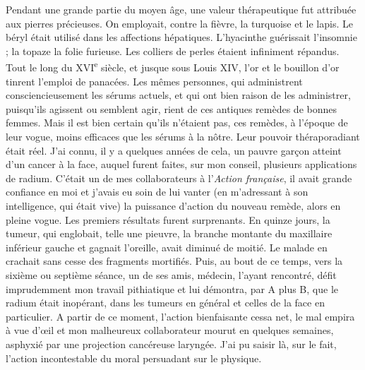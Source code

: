 \documentclass[french,twoside]{book} %
\begin{document}
Pendant une grande partie du moyen âge, une valeur thérapeutique fut attribuée aux pierres précieuses. On employait, contre la fièvre, la turquoise et le lapis. Le béryl était utilisé dans les affections hépatiques. L’hyacinthe guérissait l’insomnie ; la topaze la folie furieuse. Les colliers de perles étaient infiniment répandus. Tout le long du XVI\textsuperscript{e} siècle, et jusque sous Louis XIV, l’or et le bouillon d’or tinrent l’emploi de panacées. Les mêmes personnes, qui administrent consciencieusement les sérums actuels, et qui ont bien raison de les administrer, puisqu’ils agissent ou semblent agir, rient de ces antiques remèdes de bonnes femmes. Mais il est bien certain qu’ils n’étaient pas, ces remèdes, à l’époque de leur vogue, moins efficaces que les sérums à la nôtre. Leur pouvoir théraporadiant était réel. J’ai connu, il y a quelques années de cela, un pauvre garçon atteint d’un cancer à la face, auquel furent faites, sur mon conseil, plusieurs applications de radium. C’était un de mes collaborateurs à l’{\itshape Action française}, il avait grande confiance en moi et j’avais eu soin de lui vanter (en m’adressant à son intelligence, qui était vive) la puissance d’action du nouveau remède, alors en pleine vogue. Les premiers résultats furent surprenants. En quinze jours, la tumeur, qui englobait, telle une pieuvre, la branche montante du maxillaire inférieur gauche et gagnait l’oreille, avait diminué de moitié. Le malade en crachait sans cesse des fragments mortifiés. Puis, au bout de ce temps, vers la sixième ou septième séance, un de ses amis, médecin, l’ayant rencontré, défit imprudemment mon travail pithiatique et lui démontra, par A plus B, que le radium était inopérant, dans les tumeurs en général et celles de la face en particulier. A partir de ce moment, l’action bienfaisante cessa net, le mal empira à vue d’œil et mon malheureux collaborateur mourut en quelques semaines, asphyxié par une projection cancéreuse laryngée. J’ai pu saisir là, sur le fait, l’action incontestable du moral persuadant sur le physique.\par
\end{document}
